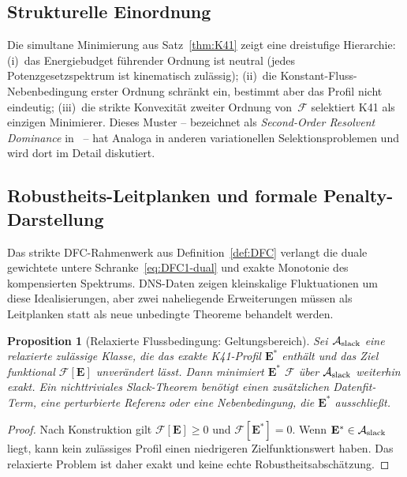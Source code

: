 \documentclass[12pt,a4paper]{article}
\theoremstyle{breakdef}
\theoremstyle{breakplain}
\newtheorem{proposition}[definition]{Proposition}
\theoremstyle{breakdef}
\begin{document}
\subsection{Strukturelle Einordnung}\label{sec:resolvent-cascade}

Die simultane Minimierung aus Satz~\ref{thm:K41} zeigt eine dreistufige
Hierarchie: (i)~das Energiebudget führender Ordnung ist neutral (jedes
Potenzgesetzspektrum ist kinematisch zulässig); (ii)~die
Konstant-Fluss-Nebenbedingung erster Ordnung schränkt ein, bestimmt aber
das Profil nicht eindeutig; (iii)~die strikte Konvexität zweiter Ordnung
von~$\mathcal{F}$ selektiert K41 als einzigen Minimierer. Dieses Muster
-- bezeichnet als \emph{Second-Order Resolvent Dominance}
in~\cite{FST-Unified2026} -- hat Analoga in anderen variationellen
Selektionsproblemen und wird dort im Detail diskutiert.

\subsection{Robustheits-Leitplanken und formale Penalty-Darstellung}\label{sec:robustness}

Das strikte DFC-Rahmenwerk aus Definition~\ref{def:DFC} verlangt die duale
gewichtete untere Schranke~\eqref{eq:DFC1-dual} und exakte Monotonie des
kompensierten Spektrums. DNS-Daten zeigen kleinskalige Fluktuationen um
diese Idealisierungen, aber zwei naheliegende Erweiterungen müssen als
Leitplanken statt als neue unbedingte Theoreme behandelt werden.

\begin{proposition}[Relaxierte Flussbedingung: Geltungsbereich]
\label{prop:dfc-slack}
Sei $\mathcal{A}_{\textup{slack}}$ eine relaxierte zulässige Klasse, die
das exakte K41-Profil $\mathbf{E}^*$ enthält und das Ziel funktional
$\mathcal{F}[\mathbf{E}]$ unverändert lässt. Dann minimiert
$\mathbf{E}^*$ $\mathcal{F}$ über $\mathcal{A}_{\textup{slack}}$ weiterhin
exakt. Ein nichttriviales Slack-Theorem benötigt einen zusätzlichen
Datenfit-Term, eine perturbierte Referenz oder eine Nebenbedingung, die
$\mathbf{E}^*$ ausschließt.
\end{proposition}

\begin{proof}
Nach Konstruktion gilt $\mathcal{F}[\mathbf{E}]\ge0$ und
$\mathcal{F}[\mathbf{E}^*]=0$. Wenn $\mathbf{E}^*\in
\mathcal{A}_{\textup{slack}}$ liegt, kann kein zulässiges Profil einen
niedrigeren Zielfunktionswert haben. Das relaxierte Problem ist daher exakt
und keine echte Robustheitsabschätzung.
\end{proof}
\end{document}
